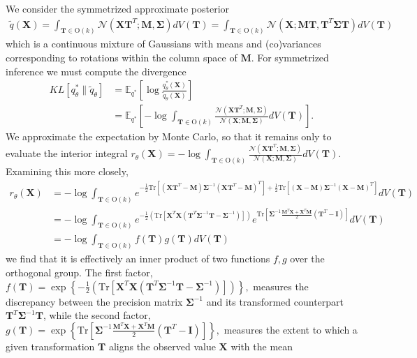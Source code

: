 \documentclass{article}
\newcommand{\N}{\mathcal{N}}
\newcommand{\E}{\mathbb{E}}
\newcommand{\Tr}{\text{Tr}}
\renewcommand{\O}{\text{O}}
\renewcommand{\v}[1]{\mathbf{#1}}
\newcommand{\I}{\v{I}}
\begin{document}
We consider the symmetrized approximate posterior
\begin{align*}
\tilde{q}(\v{X}) = \int_{\v{T}\in \O(k)} \N(\v{X}\v{T}^T; \v{M}, \v{\Sigma}) dV(\v{T}) = \int_{\v{T}\in \O(k)} \N(\v{X}; \v{M}\v{T}, \v{T}^T \v{\Sigma} \v{T}) dV(\v{T})
\end{align*}
which is a continuous mixture of Gaussians with means and (co)variances
corresponding to rotations within the column space of $\v{M}$. For symmetrized inference we must compute the divergence
\begin{align}
KL[q^*_\theta \| \tilde{q}_\theta] &= \E_{q^*}\left[\log
                                     \frac{q^*_\theta(\v{X})}{\tilde{q}_\theta(\v{X})}\right]\nonumber\\
&= \E_{q^*} \left[-\log  \int_{\v{T}\in \O(k)} \frac{\N(\v{X}\v{T}^T; \v{M}, \v{\Sigma})}{\N(\v{X}; \v{M}, \v{\Sigma} ) }  dV(\v{T})\right] \label{eqn:gauss_kl}.
\end{align}
We approximate the expectation by Monte Carlo, so that it remains
only to evaluate the interior integral $r_\theta(\v{X}) = -\log
\int_{\v{T}\in \O(k)} \frac{\N(\v{X}\v{T}^T; \v{M},
  \v{\Sigma})}{\N(\v{X}; \v{M}, \v{\Sigma} ) }  dV(\v{T})$. Examining
this more closely,
\begin{align*}
r_\theta(\v{X})
&= -\log \int_{\v{T}\in \O(k)} e^{-\frac{1}{2} \Tr \left[
  (\v{X}\v{T}^T-\v{M})\v{\Sigma}^{-1}(\v{X}\v{T}^T-\v{M})^T \right] + \frac{1}{2}\Tr \left[
  (\v{X}-\v{M})\v{\Sigma}^{-1}(\v{X}-\v{M})^T \right] }  dV(\v{T})\\
&= -\log \int_{\v{T}\in \O(k)} e^{-\frac{1}{2} \left( \Tr
  \left[\v{X}^T\v{X} \left(\v{T}^T\v{\Sigma}^{-1}\v{T} - \v{\Sigma}^{-1}\right)\right]\right)}
  e^{\Tr\left[\v{\Sigma}^{-1}\frac{\v{M}^T\v{X} + \v{X}^T\v{M}}{2}
  (\v{T}^T - \I) \right] } dV(\v{T})\\
&= -\log \int_{\v{T}\in \O(k)} f(\v{T}) g(\v{T}) dV(\v{T})
\end{align*}
we find that it is effectively an inner product of two functions $f,g$
over the orthogonal group. The first factor, $f(\v{T}) = \exp\left\{-\frac{1}{2}
  \left( \Tr \left[\v{X}^T\v{X} \left(\v{T}^T\v{\Sigma}^{-1}\v{T} - \v{\Sigma}^{-1}\right)\right]\right)\right\},$
measures the discrepancy between the precision matrix $\v{\Sigma}^{-1}$ and its
transformed counterpart $\v{T}^T\v{\Sigma}^{-1}\v{T}$, while the second factor, $g(\v{T}) = \exp\left\{\Tr\left[\v{\Sigma}^{-1}\frac{\v{M}^T\v{X} + \v{X}^T\v{M}}{2}
  (\v{T}^T - \I)\right]\right\},$ measures the extent to which a
given transformation $\v{T}$ aligns the observed value $\v{X}$ with the mean
\end{document}
